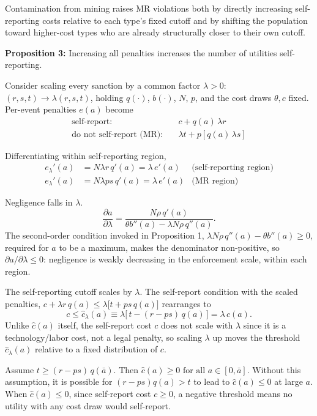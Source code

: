 \documentclass{article}
\begin{document}
    Contamination from mining raises MR violations both by directly increasing self-reporting costs relative to each type's fixed cutoff and by shifting the population toward higher-cost types who are already structurally closer to their own cutoff.

	\textbf{Proposition 3:} Increasing all penalties increases the number of utilities self-reporting. 
	
	Consider scaling every sanction by a common factor $\lambda>0$: $(r,s,t) \to \lambda(r,s,t)$, holding $q(\cdot)$, $b(\cdot)$, $N$, $p$, and the cost draws $\theta,c$ fixed. Per-event penalties $e(a)$ become
    \begin{align*}
		\text{self-report:} \quad & c + q(a)\,\lambda r \\
		\text{do not self-report (MR):} \quad & \lambda t + p\left[q(a)\,\lambda s\right]
	\end{align*}
	
	Differentiating within self-reporting region,
	\begin{align*}
		e_\lambda'(a) &= N\lambda r\,q'(a) = \lambda\, e'(a) & \text{(self-reporting region)} \\
		e_\lambda'(a) &= N\lambda ps\,q'(a) = \lambda\, e'(a) & \text{(MR region)}
	\end{align*}
	
	Negligence falls in $\lambda$.
	\[
	\frac{\partial a}{\partial \lambda} = \frac{N\rho\,q'(a)}{\theta b''(a) - \lambda N\rho\, q''(a)}.
	\]
	The second-order condition invoked in Proposition 1, $\lambda N\rho\,q''(a) - \theta b''(a) \ge 0$, required for $a$ to be a maximum, makes the denominator non-positive, so $\partial a/\partial\lambda \le 0$: negligence is weakly decreasing in the enforcement scale, within each region.
	
	The self-reporting cutoff scales by $\lambda$. The self-report condition with the scaled penalties, $c + \lambda r\,q(a) \le \lambda\big[t+ps\,q(a)\big]$ rearranges to
	\begin{equation}\label{eq:chat_lambda}
		c \le \hat{c}_\lambda(a) \equiv \lambda\big[\,t - (r-ps)\,q(a)\,\big] = \lambda\,\hat{c}(a).
	\end{equation}
	Unlike $\hat{c}(a)$ itself, the self-report cost $c$ does not scale with $\lambda$ since it is a technology/labor cost, not a legal penalty, so scaling $\lambda$ up moves the threshold $\hat{c}_\lambda(a)$ relative to a fixed distribution of $c$.
	
	Assume $t \ge (r-ps)\,q(\bar a).$ Then $\hat{c}(a)\ge 0 \text{ for all } a \in [0,\bar a]$. Without this assumption, it is possible for $(r-ps)q(a) > t$ to lead to $\hat{c}(a)\le 0$ at large $a$. When $\hat{c}(a)\le 0$, since self-report cost $c \ge 0$, a negative threshold means no utility with any cost draw would self-report.
	
\end{document}

